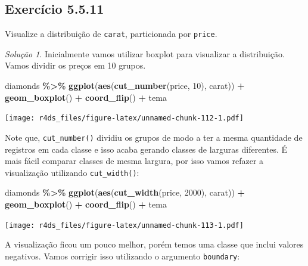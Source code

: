\documentclass[
]{latex/krantz}
\newenvironment{Shaded}{\begin{snugshade}}{\end{snugshade}}
\newcommand{\DecValTok}[1]{\textcolor[rgb]{0.00,0.00,0.81}{#1}}
\newcommand{\FunctionTok}[1]{\textcolor[rgb]{0.13,0.29,0.53}{\textbf{#1}}}
\newcommand{\NormalTok}[1]{#1}
\newcommand{\SpecialCharTok}[1]{\textcolor[rgb]{0.81,0.36,0.00}{\textbf{#1}}}
\theoremstyle{definition}
\theoremstyle{definition}
\theoremstyle{definition}
\theoremstyle{definition}
\theoremstyle{remark}
\newtheorem*{solution}{Solução}
\begin{document}
\hypertarget{exr5-5-11}{%
\subsection*{Exercício 5.5.11}\label{exr5-5-11}}

Visualize a distribuição de \texttt{carat}, particionada por \texttt{price}.

\begin{solution}
Inicialmente vamos utilizar boxplot para visualizar a distribuição. Vamos dividir os preços em 10 grupos.

\begin{Shaded}
\begin{Highlighting}[]
\NormalTok{diamonds }\SpecialCharTok{\%\textgreater{}\%}
    \FunctionTok{ggplot}\NormalTok{(}\FunctionTok{aes}\NormalTok{(}\FunctionTok{cut\_number}\NormalTok{(price, }\DecValTok{10}\NormalTok{), carat)) }\SpecialCharTok{+}
        \FunctionTok{geom\_boxplot}\NormalTok{() }\SpecialCharTok{+}
        \FunctionTok{coord\_flip}\NormalTok{() }\SpecialCharTok{+}
\NormalTok{        tema}
\end{Highlighting}
\end{Shaded}

\texttt{[image: r4ds\_files/figure-latex/unnamed-chunk-112-1.pdf]}

Note que, \texttt{cut\_number()} dividiu os grupos de modo a ter a mesma quantidade de registros em cada classe e isso acaba gerando classes de larguras diferentes. É mais fácil comparar classes de mesma largura, por isso vamos refazer a visualização utilizando \texttt{cut\_width()}:

\begin{Shaded}
\begin{Highlighting}[]
\NormalTok{diamonds }\SpecialCharTok{\%\textgreater{}\%}
    \FunctionTok{ggplot}\NormalTok{(}\FunctionTok{aes}\NormalTok{(}\FunctionTok{cut\_width}\NormalTok{(price, }\DecValTok{2000}\NormalTok{), carat)) }\SpecialCharTok{+}
        \FunctionTok{geom\_boxplot}\NormalTok{() }\SpecialCharTok{+}
        \FunctionTok{coord\_flip}\NormalTok{() }\SpecialCharTok{+}
\NormalTok{        tema}
\end{Highlighting}
\end{Shaded}

\texttt{[image: r4ds\_files/figure-latex/unnamed-chunk-113-1.pdf]}

A visualização ficou um pouco melhor, porém temos uma classe que inclui valores negativos. Vamos corrigir isso utilizando o argumento \texttt{boundary}:


\end{solution}
\end{document}
